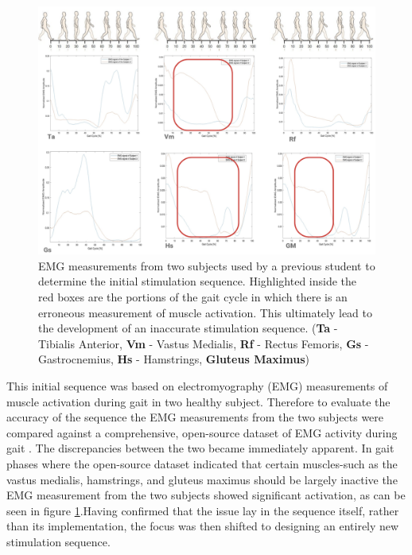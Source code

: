 \begin{figure} [h]
    \centering
    \includegraphics[width=0.99\linewidth]{images/wrongemg.png}

    \caption{EMG measurements from two subjects used by a previous student to determine the initial stimulation sequence. Highlighted inside the red boxes are the portions of the gait cycle in which there is an erroneous measurement of muscle activation. This ultimately lead to the development of an inaccurate stimulation sequence. (\textbf{Ta} - Tibialis Anterior, \textbf{Vm} - Vastus Medialis, \textbf{Rf} - Rectus Femoris, \textbf{Gs} - Gastrocnemius, \textbf{Hs} - Hamstrings, \textbf{Gluteus Maximus})}
    \label{fig:wrongemg}
\end{figure}

This initial sequence was based on electromyography (EMG) measurements of muscle activation during gait in two healthy subject. Therefore to evaluate the accuracy of the sequence the EMG measurements from the two subjects were compared against a comprehensive, open-source dataset of EMG activity during gait \cite{camargo_comprehensive_2021}. The discrepancies between the two became immediately apparent. In gait phases where the open-source dataset indicated that certain muscles-such as the vastus medialis, hamstrings, and gluteus maximus should be largely inactive the EMG measurement from the two subjects showed significant activation, as can be seen in figure \ref{fig:wrongemg}.Having confirmed that the issue lay in the sequence itself, rather than its implementation, the focus was then shifted to designing an entirely new stimulation sequence.

